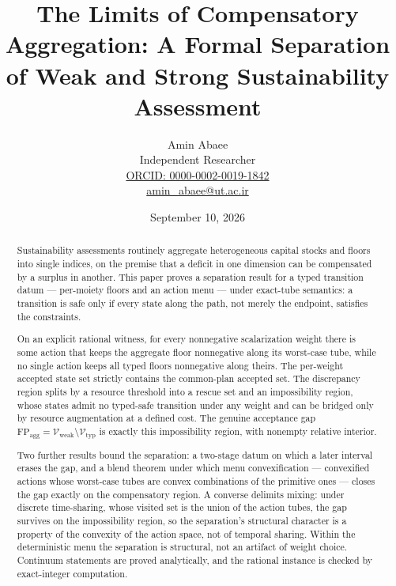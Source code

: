 \documentclass[11pt]{article}
\begin{document}
\title{The Limits of Compensatory Aggregation: A Formal Separation of Weak and Strong Sustainability Assessment}
\author{Amin Abaee\\[0.35em]
{\small Independent Researcher}\\[0.55em]
{\small\href{https://orcid.org/0000-0002-0019-1842}{ORCID: 0000-0002-0019-1842}}\\[0.3em]
{\small\href{mailto:amin\_abaee@ut.ac.ir}{amin\_abaee@ut.ac.ir}}}
\date{September 10, 2026}
\maketitle

\begin{abstract}


Sustainability assessments routinely aggregate heterogeneous capital
stocks and floors into single indices, on the premise that a deficit in
one dimension can be compensated by a surplus in another. This paper
proves a separation result for a typed transition datum --- per-moiety
floors and an action menu --- under exact-tube semantics: a transition
is safe only if every state along the path, not merely the endpoint,
satisfies the constraints.

On an explicit rational witness, for every nonnegative scalarization
weight there is some action that keeps the aggregate floor nonnegative
along its worst-case tube, while no single action keeps all typed floors
nonnegative along theirs. The per-weight accepted state set strictly
contains the common-plan accepted set. The discrepancy region splits by
a resource threshold into a rescue set and an impossibility region,
whose states admit no typed-safe transition under any weight and can be
bridged only by resource augmentation at a defined cost. The genuine
acceptance gap
\(\mathrm{FP}_{\mathrm{agg}} = \mathcal{V}_{\mathrm{weak}} \setminus \mathcal{V}_{\mathrm{typ}}\)
is exactly this impossibility region, with nonempty relative interior.

Two further results bound the separation: a two-stage datum on which a
later interval erases the gap, and a blend theorem under which menu
convexification --- convexified actions whose worst-case tubes are
convex combinations of the primitive ones --- closes the gap exactly on
the compensatory region. A converse delimits mixing: under discrete
time-sharing, whose visited set is the union of the action tubes, the
gap survives on the impossibility region, so the separation's structural
character is a property of the convexity of the action space, not of
temporal sharing. Within the deterministic menu the separation is structural, not an artifact of weight choice. Continuum statements are proved analytically, and the rational instance is checked by exact-integer computation.

\end{abstract}
\end{document}
